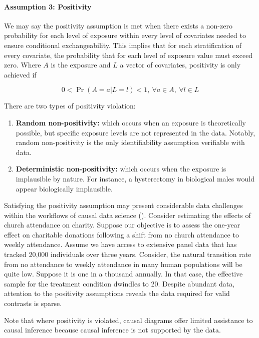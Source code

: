 \documentclass[
  singlecolumn,
  9pt]{article}
\let\oldparagraph\paragraph
\renewcommand{\paragraph}[1]{\oldparagraph{#1}\mbox{}}
\begin{document}
\paragraph{Assumption 3: Positivity}\label{assumption-3-positivity}

We may say the positivity assumption is met when there exists a non-zero
probability for each level of exposure within every level of covariates
needed to ensure conditional exchangeability. This implies that for each
stratification of every covariate, the probability that for each level
of exposure value must exceed zero. Where \(A\) is the exposure and
\(L\) a vector of covariates, positivity is only achieved if

\[
0 < \Pr(A = a | L = l) < 1, ~ \forall a \in A, ~ \forall l \in L
\]

There are two types of positivity violation:

\begin{enumerate}
\def\labelenumi{\arabic{enumi}.}
\item
  \textbf{Random non-positivity:} which occurs when an exposure is
  theoretically possible, but specific exposure levels are not
  represented in the data. Notably, random non-positivity is the only
  identifiability assumption verifiable with data.
\item
  \textbf{Deterministic non-positivity:} which occurs when the exposure
  is implausible by nature. For instance, a hysterectomy in biological
  males would appear biologically implausible.
\end{enumerate}

Satisfying the positivity assumption may present considerable data
challenges within the workflows of causal data science
(). Consider
estimating the effects of church attendance on charity. Suppose our
objective is to assess the one-year effect on charitable donations
following a shift from no church attendance to weekly attendance. Assume
we have access to extensive panel data that has tracked 20,000
individuals over three years. Consider, the natural transition rate from
no attendance to weekly attendance in many human populations will be
quite low. Suppose it is one in a thousand annually. In that case, the
effective sample for the treatment condition dwindles to 20. Despite
abundant data, attention to the positivity assumptions reveals the data
required for valid contrasts is sparse.

Note that where positivity is violated, causal diagrams offer limited
assistance to causal inference because causal inference is not supported
by the data.
\end{document}
